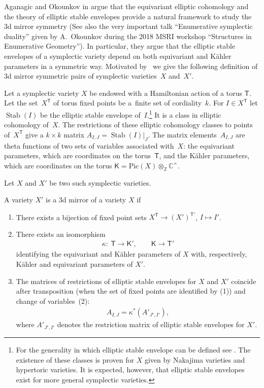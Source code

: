 \documentclass[10pt,a4paper]{amsart}
\DeclareMathOperator\Stab{Stab}
\newcommand{\bK}{\mathsf{K}}
\def\Z{{\mathbb Z}}
\def\C{{\mathbb C}}
\newcommand{\bT}{\mathsf{T}}
\numberwithin{equation}{section}
\begin{document}
Aganagic and Okounkov in \cite{AOelliptic} argue that the equivariant elliptic cohomology and the theory of elliptic stable envelopes provide a natural framework to study the 3d mirror symmetry (See also the very important talk ``Enumerative symplectic duality'' given by A.~Okounkov during the 2018 MSRI workshop ``Structures in Enumerative Geometry'').
In particular, they argue that the elliptic stable envelopes of a symplectic variety depend on both equivariant and K\"ahler parameters in a symmetric way. Motivated by~\cite{AOelliptic} we give the following definition of 3d mirror symmetric pairs of symplectic varieties~$X$ and~$X'$.

Let a symplectic variety $X$ be endowed with a Hamiltonian action of a torus $\bT$. Let the set~$X^{\bT}$ of torus fixed points be a~finite set of cordiality~$k$. For $I\in X^{\bT}$ let $\Stab(I)$ be the elliptic stable envelope of~$I$.\footnote{For the generality in which elliptic stable envelope can be defined see \cite[Chapter~3]{MO}. The existence of these classes is proven for $X$ given by Nakajima varieties and hypertoric varieties. It is expected, however, that elliptic stable envelopes exist for more general symplectic varieties.} It is a class in elliptic cohomology of~$X$. The restrictions of these elliptic cohomology classes to points of~$X^{\bT}$ give a $k\times k$ matrix $A_{I,J}= \Stab(I) |_{J}$. The matrix elements~$A_{I,J}$ are theta functions of two sets of variables associated with~$X$: the equivariant parameters, which are coordinates on the torus~$\bT$, and the K\"ahler parameters, which are coordinates on the torus $\bK=\mathrm{Pic}(X)\otimes_{\Z} \C^{\times}$.

Let $X$ and $X'$ be two such symplectic varieties.

\begin{Definition} \label{maindefin}
 A variety $X'$ is a 3d mirror of a variety $X$ if
 \begin{enumerate}\itemsep=0pt
 \item[(1)] There exists a bijection of fixed point sets $X^{\bT}\rightarrow (X')^{\bT'}$, $I\mapsto I'$.
 \item[(2)] There exists an isomorphism
 \begin{gather*}
 \kappa\colon \ \bT \rightarrow \bK', \qquad \bK \rightarrow \bT'
 \end{gather*}
 identifying the equivariant and K\"ahler parameters of $X$ with, respectively, K\"ahler and equivariant parameters of $X'$.
 \item[(3)] The matrices of restrictions of elliptic stable envelopes for $X$ and $X'$ coincide after transposition (when the set of fixed points are identified by (1)) and change of variables~(2):
 \begin{gather} \label{acoin}
 A_{I,J}=\kappa^{*}( A'_{J',I'}),
 \end{gather}
 where $A'_{J',I'}$ denotes the restriction matrix of elliptic stable envelopes for $X'$.
 \end{enumerate}
\end{Definition}
\end{document}
